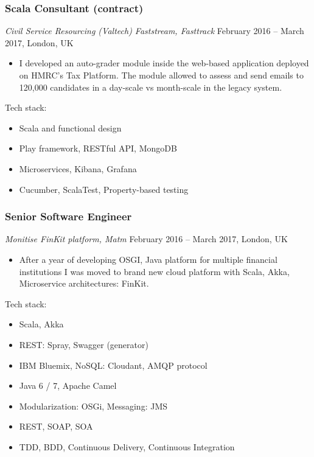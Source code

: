 \documentclass[]{rss}
\providecommand{\tightlist}{%
  \setlength{\itemsep}{0pt}\setlength{\parskip}{0pt}}
\begin{document}
\begin{resume}
\subsubsection{Scala Consultant
(contract)}\label{scala-consultant-contract}

\emph{Civil Service Resourcing (Valtech) \textbar{} Faststream,
Fasttrack} February 2016 -- March 2017, London, UK

\begin{itemize}
\tightlist
\item
  I developed an auto-grader module inside the web-based application
  deployed on HMRC's Tax Platform. The module allowed to assess and send
  emails to 120,000 candidates in a day-scale vs month-scale in the
  legacy system.
\end{itemize}

Tech stack:

\begin{itemize}
\tightlist
\item
  Scala and functional design
\item
  Play framework, RESTful API, MongoDB
\item
  Microservices, Kibana, Grafana
\item
  Cucumber, ScalaTest, Property-based testing
\end{itemize}

\subsubsection{Senior Software Engineer}\label{senior-software-engineer}

\emph{Monitise \textbar{} FinKit platform, Matm} February 2016 -- March
2017, London, UK

\begin{itemize}
\tightlist
\item
  After a year of developing OSGI, Java platform for multiple financial
  institutions I was moved to brand new cloud platform with Scala, Akka,
  Microservice architectures: FinKit.
\end{itemize}

Tech stack:

\begin{itemize}
\tightlist
\item
  Scala, Akka
\item
  REST: Spray, Swagger (generator)
\item
  IBM Bluemix, NoSQL: Cloudant, AMQP protocol
\item
  Java 6 / 7, Apache Camel
\item
  Modularization: OSGi, Messaging: JMS
\item
  REST, SOAP, SOA
\item
  TDD, BDD, Continuous Delivery, Continuous Integration
\end{itemize}


\end{resume}
\end{document}
